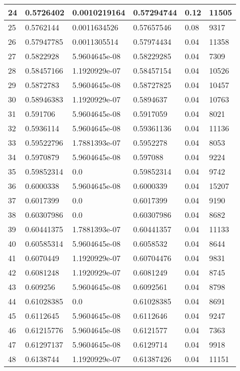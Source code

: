 \begin{longtable}{|l|l|l|l|l|l|}
24 & 0.5726402 & 0.0010219164 & 0.57294744 & 0.12 & 11505 \\ \hline 
25 & 0.5762144 & 0.0011634526 & 0.57657546 & 0.08 & 9317 \\ \hline 
26 & 0.57947785 & 0.0011305514 & 0.57974434 & 0.04 & 11358 \\ \hline 
27 & 0.5822928 & 5.9604645e-08 & 0.58229285 & 0.04 & 7309 \\ \hline 
28 & 0.58457166 & 1.1920929e-07 & 0.58457154 & 0.04 & 10526 \\ \hline 
29 & 0.5872783 & 5.9604645e-08 & 0.58727825 & 0.04 & 10457 \\ \hline 
30 & 0.58946383 & 1.1920929e-07 & 0.5894637 & 0.04 & 10763 \\ \hline 
31 & 0.591706 & 5.9604645e-08 & 0.5917059 & 0.04 & 8021 \\ \hline 
32 & 0.5936114 & 5.9604645e-08 & 0.59361136 & 0.04 & 11136 \\ \hline 
33 & 0.59522796 & 1.7881393e-07 & 0.5952278 & 0.04 & 8053 \\ \hline 
34 & 0.5970879 & 5.9604645e-08 & 0.597088 & 0.04 & 9224 \\ \hline 
35 & 0.59852314 & 0.0 & 0.59852314 & 0.04 & 9742 \\ \hline 
36 & 0.6000338 & 5.9604645e-08 & 0.6000339 & 0.04 & 15207 \\ \hline 
37 & 0.6017399 & 0.0 & 0.6017399 & 0.04 & 9190 \\ \hline 
38 & 0.60307986 & 0.0 & 0.60307986 & 0.04 & 8682 \\ \hline 
39 & 0.60441375 & 1.7881393e-07 & 0.60441357 & 0.04 & 11133 \\ \hline 
40 & 0.60585314 & 5.9604645e-08 & 0.6058532 & 0.04 & 8644 \\ \hline 
41 & 0.6070449 & 1.1920929e-07 & 0.60704476 & 0.04 & 9831 \\ \hline 
42 & 0.6081248 & 1.1920929e-07 & 0.6081249 & 0.04 & 8745 \\ \hline 
43 & 0.609256 & 5.9604645e-08 & 0.6092561 & 0.04 & 8798 \\ \hline 
44 & 0.61028385 & 0.0 & 0.61028385 & 0.04 & 8691 \\ \hline 
45 & 0.6112645 & 5.9604645e-08 & 0.6112646 & 0.04 & 9247 \\ \hline 
46 & 0.61215776 & 5.9604645e-08 & 0.6121577 & 0.04 & 7363 \\ \hline 
47 & 0.61297137 & 5.9604645e-08 & 0.6129714 & 0.04 & 9918 \\ \hline 
48 & 0.6138744 & 1.1920929e-07 & 0.61387426 & 0.04 & 11151 \\ \hline 

\end{longtable}
